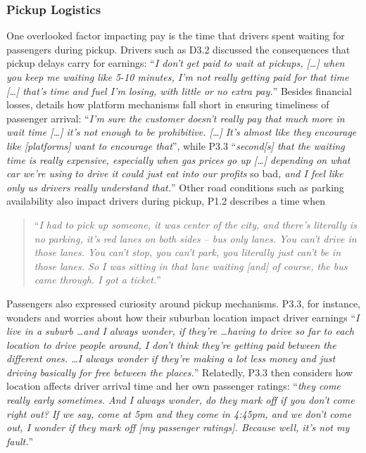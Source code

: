 \subsubsection{Pickup Logistics} \label{pickup}
One overlooked factor impacting pay is the time that drivers spent waiting for passengers during pickup. Drivers such as D3.2 discussed the consequences that pickup delays carry for earnings:
``\textit{I don't get paid to wait at pickups, [\dots] when you keep me waiting like 5-10 minutes, I'm not really getting paid for that time [\dots] that's time and fuel I'm losing, with little or no extra pay.}'' Besides financial losses,   details how platform mechanisms fall short in ensuring timeliness of passenger arrival: ``\textit{I'm sure the customer doesn't really pay that much more in wait time [\dots] it's not enough to be prohibitive. [\dots] It's almost like they encourage like [platforms] want to encourage that}'', while P3.3 ``\textit{second[s] that the waiting time is really expensive, especially when gas prices go up [\dots] depending on what car we're using to drive it could just eat into our profits }so bad\textit{, and I feel like only us drivers really understand that.}'' Other road conditions such as parking availability also impact drivers during pickup, P1.2 describes a time when 
\begin{quote}
    ``\textit{I had to pick up someone, it was center of the city, and there's literally is no parking, it's red lanes on both sides -- bus only lanes. You can't drive in those lanes. You can't stop, you can't park, you literally just can't be in those lanes. So I was sitting in that lane waiting [and] of course, the bus came through. I got a ticket.}''
\end{quote}

Passengers also expressed curiosity around pickup mechanisms. P3.3, for instance, wonders and worries about how their suburban location impact driver earnings  ``\textit{I live in a suburb \dots and I always wonder, if they're  \dots having to drive so far to each location to drive people around, I don't think they're getting paid between the different ones. \dots I always wonder if they're making a lot less money and just driving basically for free between the places.}'' Relatedly, P3.3 then considers how location affects driver arrival time and her own passenger ratings: ``\textit{they come really early sometimes. And I always wonder, do they mark off if you don't come right out? If we say, come at 5pm and they come in 4:45pm, and we don't come out, I wonder if they mark off [my passenger ratings]. Because well, it's not my fault.}''

